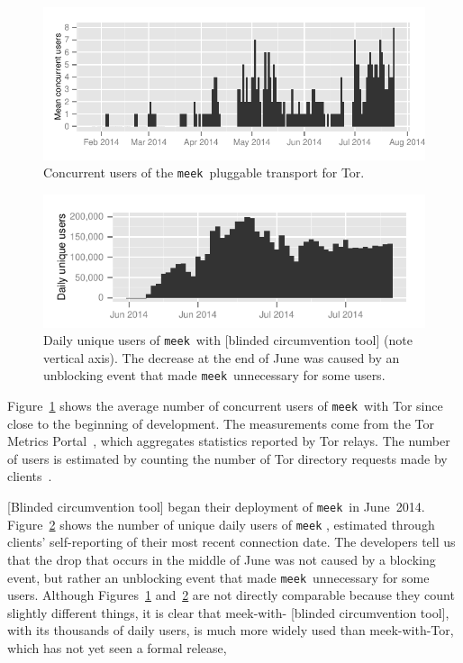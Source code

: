 \documentclass[conference]{IEEEtran}
\newcommand{\meek}{\texttt{meek}\xspace}
\begin{document}
\begin{figure}
\includegraphics[width=\linewidth]{clients-meek}
\caption{
Concurrent users of the \meek\ pluggable transport for Tor.
}
\label{fig:clients-tor}
\end{figure}

\begin{figure}
\includegraphics[width=\linewidth]{clients-psiphon3}
\caption{
Daily unique users of \meek\ with
[blinded circumvention tool]
(note vertical axis).
The decrease at the end of June
was caused by an unblocking event that made \meek\ unnecessary for some users.
}
\label{fig:clients-psiphon3}
\end{figure}

Figure~\ref{fig:clients-tor} shows the average number of concurrent users of \meek\ with Tor
since close to the beginning of development.
The measurements come from the Tor Metrics Portal~\cite{metrics-meek},
which aggregates statistics reported by Tor relays.
The number of users is estimated by counting the number
of Tor directory requests made by clients~\cite{counting-daily-bridge-users}.

[Blinded circumvention tool]
began their deployment of \meek\ in June~2014.
Figure~\ref{fig:clients-psiphon3} shows the number
of unique daily users of \meek%
,
estimated through clients' self-reporting of their most recent connection date.
The developers tell us that the drop that occurs
in the middle of June was not caused by a blocking event,
but rather an unblocking event that made \meek\ unnecessary for some users.
Although Figures~\ref{fig:clients-tor} and~\ref{fig:clients-psiphon3}
are not directly comparable because they count slightly different things,
it is clear that meek-with-%
[blinded circumvention tool],
with its thousands of daily users,
is much more widely used than meek-with-Tor, which has not yet seen a formal release,
\end{document}
